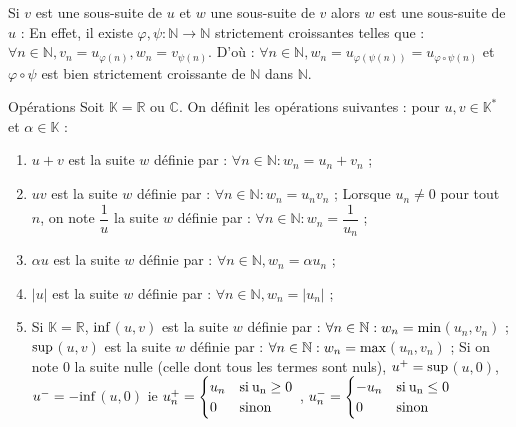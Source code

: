 \documentclass[12pt,a4paper]{report}
\begin{document}
\begin{remarque}
Si $v$ est une sous-suite de $u$ et $w$ une sous-suite de $v$ alors $w$ est une sous-suite de $u$ : 
\newline En effet, il existe $\varphi,\psi : \mathbb{N} \rightarrow \mathbb{N}$ strictement croissantes telles que : \newline $\forall n \in \mathbb{N}, v_n = u_{\varphi(n)}, w_n = v_{\psi(n)}$. 
\newline D'où : $\forall n \in \mathbb{N}, w_n = u_{\varphi(\psi(n))} = u_{\varphi \circ \psi (n)}$ et $\varphi \circ \psi$ est bien strictement croissante de $\mathbb{N}$ dans $\mathbb{N}$.
\end{remarque}


\begin{definition}{Opérations}{}
Soit $\mathbb{K} = \mathbb{R}$ ou $\mathbb{C}$. On définit les opérations suivantes : pour $u,v \in \mathbb{K}^*$ et $\alpha \in \mathbb{K}$ : 
\begin{enumerate}
\item $u+v$ est la suite $w$ définie par : $\forall n \in \mathbb{N} : w_n = u_n + v_n$ ;
\item $uv$ est la suite $w$ définie par : $\forall n \in \mathbb{N} : w_n = u_nv_n$ ;
\newline Lorsque $u_n \neq 0$ pour tout $n$, on note $\dfrac{1}{u}$ la suite $w$ définie par : $\forall n \in \mathbb{N} : w_n = \dfrac{1}{u_n}$ ;
\item $\alpha u$ est la suite $w$ définie par : $\forall n \in \mathbb{N}, w_n = \alpha u_n$ ;
\item $\lvert u \rvert$ est la suite $w$ définie par : $\forall n \in \mathbb{N}, w_n = \lvert u_n \rvert$ ;
\item Si $\mathbb{K} = \mathbb{R}$, $\rm{inf}$$(u,v)$ est la suite $w$ définie par : $\forall n \in \mathbb{N} : w_n = \rm{min}$$(u_n,v_n)$ ;
\newline $\rm{sup}$$(u,v)$ est la suite $w$ définie par : $\forall n \in \mathbb{N} : w_n = \rm{max}$$(u_n,v_n)$ ; 
\newline Si on note $0$ la suite nulle (celle dont tous les termes sont nuls), $u^+ = \rm{sup}$$(u,0)$, $u^- = -\rm{inf}$$(u,0)$
\newline ie $u^+_n = 
\begin{cases}
u_n &\rm{si } \: u_n \geq 0 \\
0 & \rm{sinon}
\end{cases}$
, $u^-_n = 
\begin{cases}
-u_n &\rm{si } \: u_n \leq 0 \\
0 & \rm{sinon}
\end{cases}$


\end{enumerate}
\end{definition}
\end{document}
